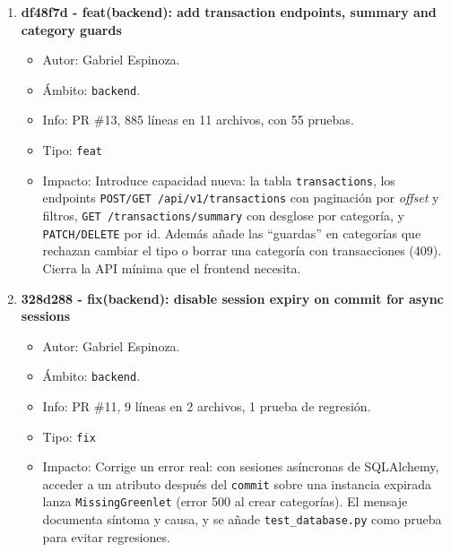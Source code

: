 \begin{enumerate}
    \item \textbf{df48f7d - feat(backend): add transaction endpoints, summary and category guards}
          \begin{itemize}
              \item Autor: Gabriel Espinoza.
              \item Ámbito: \texttt{backend}.
              \item Info: PR \#13, 885 líneas en 11 archivos, con 55 pruebas.
              \item Tipo: \texttt{feat}
              \item Impacto: Introduce capacidad nueva: la tabla \texttt{transactions}, los endpoints \texttt{POST/GET /\allowbreak api/v1/\allowbreak transactions} con paginación por \emph{offset} y filtros, \texttt{GET /\allowbreak transactions/\allowbreak summary} con desglose por categoría, y \texttt{PATCH/DELETE} por id. Además añade las ``guardas'' en categorías que rechazan cambiar el tipo o borrar una categoría con transacciones (409). Cierra la API mínima que el frontend necesita.
          \end{itemize}

    \item \textbf{328d288 - fix(backend): disable session expiry on commit for async sessions}
          \begin{itemize}
              \item Autor: Gabriel Espinoza.
              \item Ámbito: \texttt{backend}.
              \item Info: PR \#11, 9 líneas en 2 archivos, 1 prueba de regresión.
              \item Tipo: \texttt{fix}
              \item Impacto: Corrige un error real: con sesiones asíncronas de SQLAlchemy, acceder a un atributo después del \texttt{commit} sobre una instancia expirada lanza \texttt{MissingGreenlet} (error 500 al crear categorías). El mensaje documenta síntoma y causa, y se añade \texttt{test\_database.py} como prueba para evitar regresiones.
          \end{itemize}


\end{enumerate}
